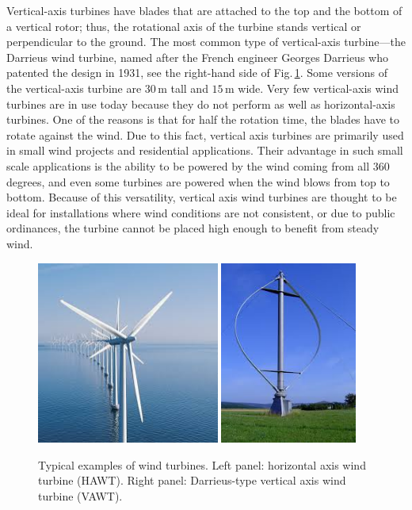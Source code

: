 Vertical-axis turbines have blades that are attached to the top and the bottom of a vertical rotor; thus, the rotational axis of the turbine stands vertical or perpendicular to the ground. The most common type of vertical-axis turbine—the Darrieus wind turbine, named after the French engineer Georges Darrieus who patented the design in 1931, see the right-hand side of Fig.\,\ref{Fig:Examples_HAWT_VAWT}. Some versions of the vertical-axis turbine are $30\,\mathrm{m}$ tall and $15\,\mathrm{m}$ wide. Very few vertical-axis wind turbines are in use today because they do not perform as well as horizontal-axis turbines. One of the reasons is that for half the rotation time, the blades have to rotate against the wind. Due to this fact, vertical axis turbines are primarily used in small wind projects and residential applications. Their advantage in such small scale applications is the ability to be powered by the wind coming from all 360 degrees, and even some turbines are powered when the wind blows from top to bottom. Because of this versatility, vertical axis wind turbines are thought to be ideal for installations where wind conditions are not consistent, or due to public ordinances, the turbine cannot be placed high enough to benefit from steady wind.

\begin{figure}[ht!]
	\centering
		\includegraphics[height=6cm]{HydroAndWindPower/Figures/Example_HAWT.jpg}
		\includegraphics[height=6cm]{HydroAndWindPower/Figures/Example_VAWT.jpg}
	\caption{Typical examples of wind turbines. Left panel: horizontal axis wind turbine (HAWT). Right panel: Darrieus-type vertical axis wind turbine (VAWT).}
	\label{Fig:Examples_HAWT_VAWT}
\end{figure}

